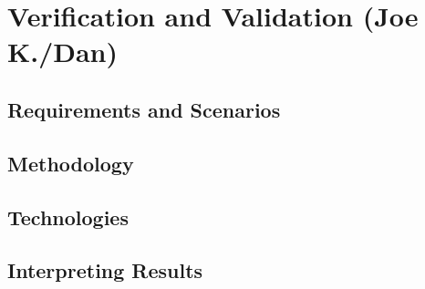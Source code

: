 \chapter{Verification and Validation (Joe K./Dan)}
\label{chapter:v_and_v}

\section{Requirements and Scenarios}
\section{Methodology}
\section{Technologies}
\section{Interpreting Results}
